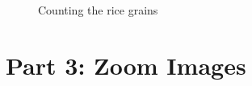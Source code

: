 \documentclass[a4paper,11pt]{article}%
\begin{document}
\begin{figure}[!h]
{	}
	\caption{Counting the rice grains}
\end{figure}



\section{Part 3: Zoom Images}


\end{document}
